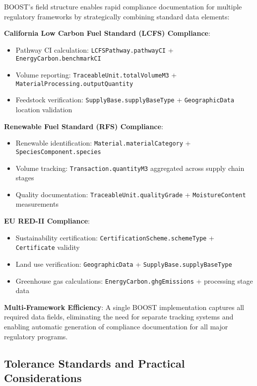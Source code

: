 BOOST's field structure enables rapid compliance documentation for multiple regulatory frameworks by strategically combining standard data elements:

\textbf{California Low Carbon Fuel Standard (LCFS) Compliance}:
\begin{itemize}
\item Pathway CI calculation: \texttt{LCFSPathway.pathwayCI} + \texttt{EnergyCarbon.benchmarkCI}
\item Volume reporting: \texttt{TraceableUnit.totalVolumeM3} + \texttt{MaterialProcessing.outputQuantity}
\item Feedstock verification: \texttt{SupplyBase.supplyBaseType} + \texttt{GeographicData} location validation
\end{itemize}

\textbf{Renewable Fuel Standard (RFS) Compliance}:
\begin{itemize}
\item Renewable identification: \texttt{Material.materialCategory} + \texttt{SpeciesComponent.species}
\item Volume tracking: \texttt{Transaction.quantityM3} aggregated across supply chain stages
\item Quality documentation: \texttt{TraceableUnit.qualityGrade} + \texttt{MoistureContent} measurements
\end{itemize}

\textbf{EU RED-II Compliance}:
\begin{itemize}
\item Sustainability certification: \texttt{CertificationScheme.schemeType} + \texttt{Certificate} validity
\item Land use verification: \texttt{GeographicData} + \texttt{SupplyBase.supplyBaseType}
\item Greenhouse gas calculations: \texttt{EnergyCarbon.ghgEmissions} + processing stage data
\end{itemize}

\textbf{Multi-Framework Efficiency}: A single BOOST implementation captures all required data fields, eliminating the need for separate tracking systems and enabling automatic generation of compliance documentation for all major regulatory programs.

\subsection{Tolerance Standards and Practical Considerations}
\label{sec:tolerance-standards}

